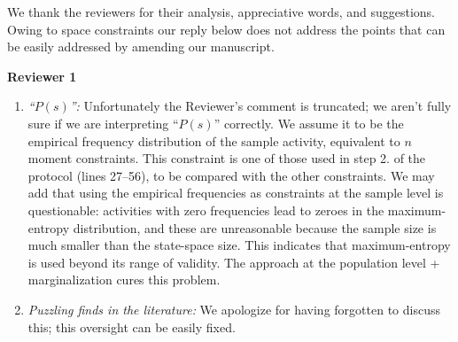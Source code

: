 \documentclass{article}
\begin{document}
We thank the reviewers for their analysis, appreciative words, and
suggestions. Owing to space constraints our reply below does not address
the points that can be easily addressed by amending our manuscript.

\bigskip

\textbf{Reviewer 1}
\begin{enumerate}[wide]
\item \emph{\enquote{$P(s)$}:} Unfortunately the Reviewer's comment is
  truncated; we aren't fully sure if we are interpreting \enquote{$P(s)$}
  correctly. We assume it to be the empirical frequency distribution of the
  sample activity, equivalent to $n$ moment constraints. This constraint is
  one of those used in step 2. of the protocol (lines 27--56), to be
  compared with the other constraints. We may add that using the
  empirical frequencies as constraints at the sample level is questionable:
  activities with zero frequencies lead to zeroes in the maximum-entropy
  distribution, and these are unreasonable because the sample size is much
  smaller than the state-space size. This indicates that maximum-entropy is
  used beyond its range of validity. The approach at the population level +
  marginalization cures this problem.
\item \emph{Puzzling finds in the literature:} We apologize for having
  forgotten to discuss this; this oversight can be easily fixed.
\end{enumerate}

\bigskip
\end{document}
